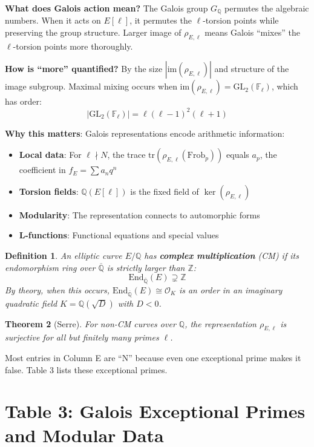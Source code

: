 \documentclass[11pt]{article}
\newtheorem{theorem}{Theorem}
\newtheorem{definition}[theorem]{Definition}
\begin{document}
\textbf{What does Galois action mean?} The Galois group $G_{\mathbb{Q}}$ permutes the algebraic numbers. When it acts on $E[\ell]$, it permutes the $\ell$-torsion points while preserving the group structure. Larger image of $\rho_{E,\ell}$ means Galois ``mixes'' the $\ell$-torsion points more thoroughly.

\textbf{How is ``more'' quantified?} By the size $|\text{im}(\rho_{E,\ell})|$ and structure of the image subgroup. Maximal mixing occurs when $\text{im}(\rho_{E,\ell}) = \text{GL}_2(\mathbb{F}_\ell)$, which has order:
$$|\text{GL}_2(\mathbb{F}_\ell)| = \ell(\ell-1)^2(\ell+1)$$

\textbf{Why this matters}: Galois representations encode arithmetic information:
\begin{itemize}
\item \textbf{Local data}: For $\ell \nmid N$, the trace $\text{tr}(\rho_{E,\ell}(\text{Frob}_p))$ equals $a_p$, the coefficient in $f_E = \sum a_n q^n$
\item \textbf{Torsion fields}: $\mathbb{Q}(E[\ell])$ is the fixed field of $\ker(\rho_{E,\ell})$
\item \textbf{Modularity}: The representation connects to automorphic forms
\item \textbf{L-functions}: Functional equations and special values
\end{itemize}

\begin{definition}
An elliptic curve $E/\mathbb{Q}$ has \textbf{complex multiplication} (CM) if its endomorphism ring over $\overline{\mathbb{Q}}$ is strictly larger than $\mathbb{Z}$:
$$\text{End}_{\overline{\mathbb{Q}}}(E) \supsetneq \mathbb{Z}$$
By theory, when this occurs, $\text{End}_{\overline{\mathbb{Q}}}(E) \cong \mathcal{O}_K$ is an order in an imaginary quadratic field $K = \mathbb{Q}(\sqrt{D})$ with $D < 0$.
\end{definition}

\begin{theorem}[Serre]
For non-CM curves over $\mathbb{Q}$, the representation $\rho_{E,\ell}$ is surjective for all but finitely many primes $\ell$.
\end{theorem}

Most entries in Column E are ``N'' because even one exceptional prime makes it false. Table 3 lists these exceptional primes.

\section{Table 3: Galois Exceptional Primes and Modular Data}
\end{document}
